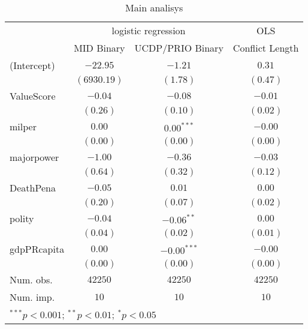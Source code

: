 
\begin{table}
\begin{center}
\begin{tabular}{l c c c}
\hline
 & \multicolumn{2}{c}{logistic regression} & \multicolumn{1}{c}{OLS} \\
\cline{2-3} \cline{4-4}
 & MID Binary & UCDP/PRIO Binary & Conflict Length \\
\hline
(Intercept) & $-22.95$    & $-1.21$       & $0.31$   \\
            & $(6930.19)$ & $(1.78)$      & $(0.47)$ \\
ValueScore  & $-0.04$     & $-0.08$       & $-0.01$  \\
            & $(0.26)$    & $(0.10)$      & $(0.02)$ \\
milper      & $0.00$      & $0.00^{***}$  & $-0.00$  \\
            & $(0.00)$    & $(0.00)$      & $(0.00)$ \\
majorpower  & $-1.00$     & $-0.36$       & $-0.03$  \\
            & $(0.64)$    & $(0.32)$      & $(0.12)$ \\
DeathPena   & $-0.05$     & $0.01$        & $0.00$   \\
            & $(0.20)$    & $(0.07)$      & $(0.02)$ \\
polity      & $-0.04$     & $-0.06^{**}$  & $0.00$   \\
            & $(0.04)$    & $(0.02)$      & $(0.01)$ \\
gdpPRcapita & $0.00$      & $-0.00^{***}$ & $-0.00$  \\
            & $(0.00)$    & $(0.00)$      & $(0.00)$ \\
\hline
Num. obs.   & $42250$     & $42250$       & $42250$  \\
Num. imp.   & $10$        & $10$          & $10$     \\
\hline
\multicolumn{4}{l}{\scriptsize{$^{***}p<0.001$; $^{**}p<0.01$; $^{*}p<0.05$}}
\end{tabular}
\caption{Main analisys}
\label{Frreg}
\end{center}
\end{table}
